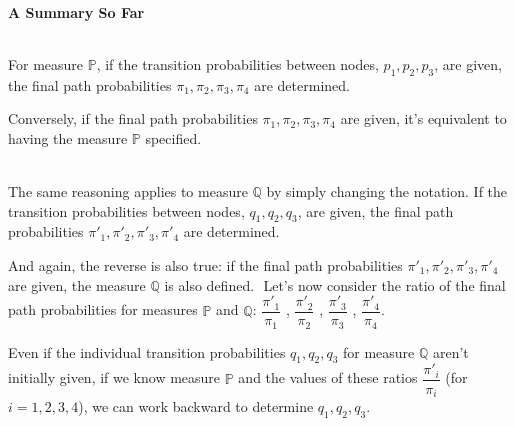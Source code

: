 \documentclass[uplatex,a4j,12pt,dvipdfmx]{jsarticle}
\begin{document}
\paragraph{A Summary So Far}

${}$

For measure $\mathbb{P}$, if the transition probabilities between nodes, $p_{1},p_{2},p_{3}$, are given, the final path probabilities $\pi_{1},\pi_{2},\pi_{3},\pi_{4}$ are determined.

Conversely, if the final path probabilities $\pi_{1},\pi_{2},\pi_{3},\pi_{4}$ are given, it's equivalent to having the measure $\mathbb{P}$ specified.

\ \\

The same reasoning applies to measure $\mathbb{Q}$ by simply changing the notation. If the transition probabilities between nodes, $q_{1},q_{2},q_{3}$, are given, the final path probabilities $\pi'_{1},\pi'_{2},\pi'_{3},\pi'_{4}$ are determined.

And again, the reverse is also true: if the final path probabilities $\pi'_{1},\pi'_{2},\pi'_{3},\pi'_{4}$ are given, the measure $\mathbb{Q}$ is also defined.
${}$
Let's now consider the ratio of the final path probabilities for measures $\mathbb{P}$ and $\mathbb{Q}$:
$\dfrac{ \pi'_{1} }{ \pi_{1} }$
,
$\dfrac{ \pi'_{2} }{ \pi_{2} }$
,
$\dfrac{ \pi'_{3} }{ \pi_{3} }$
,
$\dfrac{ \pi'_{4} }{ \pi_{4} }$.

Even if the individual transition probabilities $q_{1},q_{2},q_{3}$ for measure $\mathbb{Q}$ aren't initially given, if we know measure $\mathbb{P}$ and the values of these ratios $\dfrac{ \pi'_{i} }{ \pi_{i} }$ (for $i=1,2,3,4$), we can work backward to determine $q_{1},q_{2},q_{3}$.
\end{document}

